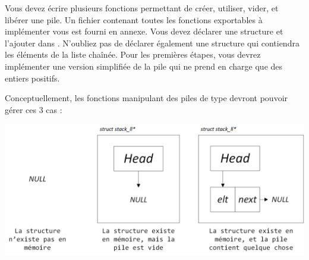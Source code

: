 

\vspace*{0.7cm}

\noindent {}

\bigskip

%

\noindent Vous devez écrire plusieurs fonctions permettant de créer, utiliser, vider, et libérer une pile.
Un fichier  contenant toutes les fonctions exportables à implémenter vous est fourni en annexe.
Vous devez déclarer une structure  et l'ajouter dans .
N'oubliez pas de déclarer également une structure qui contiendra les éléments de la liste chaînée.
Pour les premières étapes, vous devrez implémenter une version simplifiée de la pile qui ne prend en charge que des entiers positifs.

\bigskip

\noindent Conceptuellement, les fonctions manipulant des piles de type  devront pouvoir gérer ces 3 cas :

\bigskip

\begin{center}
\includegraphics[scale=0.85]{Cours/Piles_Implementation_LL.png}
\end{center}

